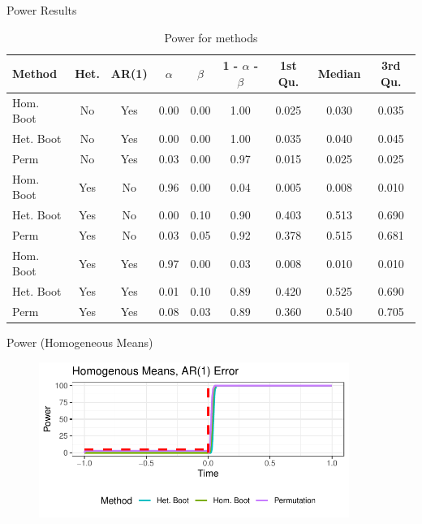 \documentclass{beamer}
\begin{document}
\begin{frame}{Power Results}\footnotesize
\begin{table}[H]
\centering
\begin{tabular}{lcccccccc}
  \hline
Method & Het. & AR(1) & $\alpha$ & $\beta$ & 1 - $\alpha$ - $\beta$ & 1st Qu. & Median & 3rd Qu. \\ 
  \hline
Hom. Boot & No & Yes & 0.00 & 0.00 & 1.00 & 0.025 & 0.030 & 0.035 \\ 
  Het. Boot & No & Yes & 0.00 & 0.00 & 1.00 & 0.035 & 0.040 & 0.045 \\ 
  Perm & No & Yes & 0.03 & 0.00 & 0.97 & 0.015 & 0.025 & 0.025 \\ 
  \hline
  Hom. Boot & Yes & No & 0.96 & 0.00 & 0.04 & 0.005 & 0.008 & 0.010 \\ 
  Het. Boot & Yes & No & 0.00 & 0.10 & 0.90 & 0.403 & 0.513 & 0.690 \\ 
  Perm & Yes & No & 0.03 & 0.05 & 0.92 & 0.378 & 0.515 & 0.681 \\ 
  \hline
  Hom. Boot & Yes & Yes & 0.97 & 0.00 & 0.03 & 0.008 & 0.010 & 0.010 \\ 
  Het. Boot & Yes & Yes & 0.01 & 0.10 & 0.89 & 0.420 & 0.525 & 0.690 \\ 
  Perm & Yes & Yes & 0.08 & 0.03 & 0.89 & 0.360 & 0.540 & 0.705 \\ 
   \hline
\end{tabular}
\caption{Power for methods} 
\label{tab:power_methods}
\end{table}
\end{frame}

\begin{frame}{Power (Homogeneous Means)}
\begin{figure}
\centering
\includegraphics[width=0.9\textwidth]{type_two_error_time_a.pdf}
\end{figure}
\end{frame}
\end{document}
